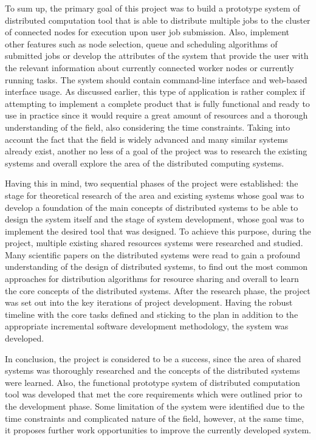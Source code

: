\documentclass[10pt]{report}
\begin{document}
To sum up, the primary goal of this project was to build a prototype system of distributed computation tool that is able to distribute multiple jobs to the cluster of connected nodes for execution upon user job submission. Also, implement other features such as node selection, queue and scheduling algorithms of submitted jobs or develop the attributes of the system that provide the user with the relevant information about currently connected worker nodes or currently running tasks. The system should contain command-line interface and web-based interface usage. As discussed earlier, this type of application is rather complex if attempting to implement a complete product that is fully functional and ready to use in practice since it would require a great amount of resources and a thorough understanding of the field, also considering the time constraints. Taking into account the fact that the field is widely advanced and many similar systems already exist, another no less of a goal of the project was to research the existing systems and overall explore the area of the distributed computing systems.
\newline

Having this in mind, two sequential phases of the project were established: the stage for theoretical research of the area and existing systems whose goal was to develop a foundation of the main concepts of distributed systems to be able to design the system itself and the stage of system development, whose goal was to implement the desired tool that was designed. To achieve this purpose, during the project, multiple existing shared resources systems were researched and studied. Many scientific papers on the distributed systems were read to gain a profound understanding of the design of distributed systems, to find out the most common approaches for distribution algorithms for resource sharing and overall to learn the core concepts of the distributed systems. After the research phase, the project was set out into the key iterations of project development. Having the robust timeline with the core tasks defined and sticking to the plan in addition to the appropriate incremental software development methodology, the system was developed.
\newline

In conclusion, the project is considered to be a success, since the area of shared systems was thoroughly researched and the concepts of the distributed systems were learned. Also, the functional prototype system of distributed computation tool was developed that met the core requirements which were outlined prior to the development phase. Some limitation of the system were identified due to the time constraints and complicated nature of the field, however, at the same time, it proposes further work opportunities to improve the currently developed system.
\end{document}
